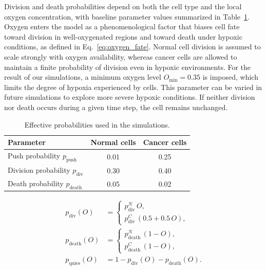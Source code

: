\documentclass[11pt,a4paper,twoside]{article}
\begin{document}
Division and death probabilities depend on both the cell type and the local oxygen concentration, with baseline
parameter values summarized in Table~\ref{table:parameters}. Oxygen enters the model as a phenomenological factor 
that biases cell fate toward division in well-oxygenated regions and toward death under hypoxic conditions, as defined in Eq.~\eqref{eq:oxygen_fate}.
Normal cell division is assumed to scale strongly with oxygen availability, whereas cancer cells are allowed
to maintain a finite probability of division even in hypoxic environments. For the result of our simulations, a minimum oxygen level 
$O_{\min} = 0.35 $ is imposed, which limits the degree of hypoxia experienced by cells. 
This parameter can be varied in future simulations to explore more severe hypoxic conditions.
If neither division nor death occurs during a given time step, the cell remains unchanged.

\begin{table}[H]
\centering
\caption{Effective probabilities used in the simulations.}
\begin{tabular}{lcc}
\toprule
Parameter & Normal cells & Cancer cells \\
\midrule
Push probability $p_{\text{push}}$ & 0.01 & 0.25 \\
Division probability $p_{\text{div}}$ & 0.30 & 0.40 \\
Death probability $p_{\text{death}}$ & 0.05 & 0.02 \\
\bottomrule
\end{tabular}
\label{table:parameters}
\end{table}



\begin{equation}
\begin{aligned}
p_{\mathrm{div}}(O) &=
\begin{cases}
p_{\mathrm{div}}^{N}\, O, \\
p_{\mathrm{div}}^{C}\,(0.5 + 0.5\,O),
\end{cases} \\[6pt]
p_{\mathrm{death}}(O) &=
\begin{cases}
p_{\mathrm{death}}^{N}\,(1 - O), \\
p_{\mathrm{death}}^{C}\,(1 - O),
\end{cases} \\[6pt]
p_{\mathrm{quies}}(O) &= 1 - p_{\mathrm{div}}(O) - p_{\mathrm{death}}(O).
\end{aligned}
\label{eq:oxygen_fate}
\end{equation}
\end{document}
